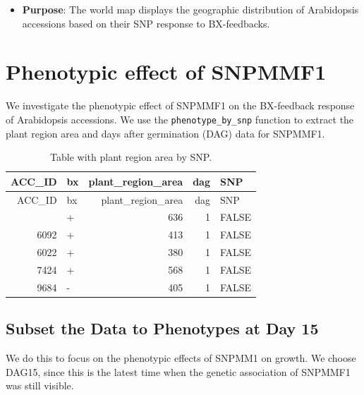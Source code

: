 \documentclass[
  11pt,
]{article}
\providecommand{\tightlist}{%
  \setlength{\itemsep}{0pt}\setlength{\parskip}{0pt}}\usepackage{longtable,booktabs,array}
\begin{document}
\begin{itemize}
\tightlist
\item
  \textbf{Purpose}: The world map displays the geographic distribution
  of Arabidopsis accessions based on their SNP response to BX-feedbacks.
\end{itemize}

\section{Phenotypic effect of
SNPMMF1}\label{phenotypic-effect-of-snpmmf1}

We investigate the phenotypic effect of SNPMMF1 on the BX-feedback
response of Arabidopsis accessions. We use the
\texttt{phenotype\_by\_snp} function to extract the plant region area
and days after germination (DAG) data for SNPMMF1.

\begin{longtable}[]{@{}rlrrl@{}}
\caption{Table with plant region area by SNP.}\tabularnewline
\toprule\noalign{}
ACC\_ID & bx & plant\_region\_area & dag & SNP \\
\midrule\noalign{}
\endfirsthead
\toprule\noalign{}
ACC\_ID & bx & plant\_region\_area & dag & SNP \\
\midrule\noalign{}
\endhead
\bottomrule\noalign{}
\endlastfoot
9830 & + & 636 & 1 & FALSE \\
6092 & + & 413 & 1 & FALSE \\
6022 & + & 380 & 1 & FALSE \\
7424 & + & 568 & 1 & FALSE \\
9684 & - & 405 & 1 & FALSE \\
\end{longtable}

\subsection{Subset the Data to Phenotypes at Day
15}\label{subset-the-data-to-phenotypes-at-day-15}

We do this to focus on the phenotypic effects of SNPMM1 on growth. We
choose DAG15, since this is the latest time when the genetic association
of SNPMMF1 was still visible.
\end{document}
